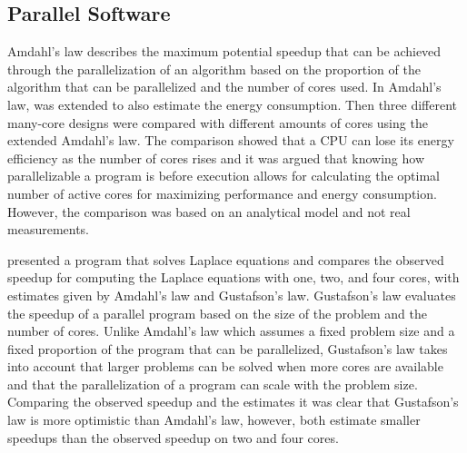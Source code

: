 \subsection{Parallel Software}

Amdahl's law describes the maximum potential speedup that can be achieved through the parallelization of an algorithm based on the proportion of the algorithm that can be parallelized and the number of cores used.\cite{amdahl1967validity} In \cite{woo2008extending} Amdahl's law, was extended to also estimate the energy consumption.  Then three different many-core designs were compared with different amounts of cores using the extended Amdahl's law. The comparison showed that a CPU can lose its energy efficiency as the number of cores rises and it was argued that knowing how parallelizable a program is before execution allows for calculating the optimal number of active cores for maximizing performance and energy consumption. However, the comparison was based on an analytical model and not real measurements.\cite{woo2008extending}

\cite{prinslow2011overview} presented a program that solves Laplace equations and compares the observed speedup for computing the Laplace equations with one, two, and four cores, with estimates given by Amdahl's law and Gustafson's law.  Gustafson's law evaluates the speedup of a parallel program based on the size of the problem and the number of cores. Unlike Amdahl's law which assumes a fixed problem size and a fixed proportion of the program that can be parallelized, Gustafson's law takes into account that larger problems can be solved when more cores are available and that the parallelization of a program can scale with the problem size. Comparing the observed speedup and the estimates it was clear that Gustafson's law is more optimistic than Amdahl's law, however, both estimate smaller speedups than the observed speedup on two and four cores. \cite{prinslow2011overview}


